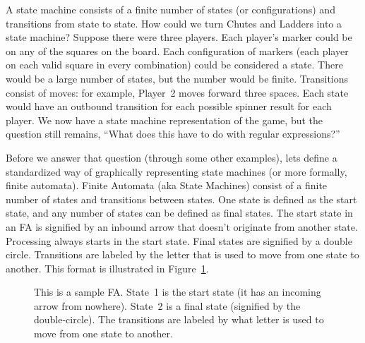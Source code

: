 \documentclass[letterpaper,12pt,openany,reqno]{book}%
\newcommand{\faterminalnode}[3] {\draw (#1) circle [radius=9pt]; \node at (#1) (#2) [circle, draw, minimum size=24pt] {#2};}
\newcommand{\fastart}[1] {\coordinate (start) at (#1);}
\newcommand{\fanonterminalnode}[2] {\node at (#1) (#2) [circle, draw, minimum size=24pt] {#2};}
\newcommand{\fatransition}[3] {\draw [-{Latex[length=3mm,width=2.5mm]}] (#1) -- (#2) node [midway, above] {#3};}
\newcommand{\faarctransition}[5] {\draw [-{Latex[length=3mm,width=2.5mm]}] (#1) to[out=#4, in=#5] node  [midway, above] {#3} (#2) ;}
\begin{document}
A state machine consists of a finite number of states (or configurations) and transitions from state to state. How could we turn Chutes and Ladders into a state machine? Suppose there were three players. Each player's marker could be on any of the squares on the board. Each configuration of markers (each player on each valid square in every combination) could be considered a state. There would be a large number of states, but the number would be finite. Transitions consist of moves: for example, Player~2 moves forward three spaces. Each state would have an outbound transition for each possible spinner result for each player. We now have a state machine representation of the game, but the question still remains, ``What does this have to do with regular expressions?''

Before we answer that question (through some other examples), lets define a standardized way of graphically representing state machines (or more formally, finite automata). Finite Automata (aka State Machines) consist of a finite number of states and transitions between states. One state is defined as the start state, and any number of states can be defined as final states. The start state in an FA is signified by an inbound arrow that doesn't originate from another state. Processing always starts in the start state. Final states are signified by a double circle. Transitions are labeled by the letter that is used to move from one state to another. This format is illustrated in Figure~\ref{F.FA_1}.

\begin{figure}[hbt]
\centering
{}
 \caption[Sample Finite Automaton]{This is a sample FA. State~1 is the start state (it has an incoming arrow from nowhere). State~2 is a final state (signified by the double-circle). The transitions are labeled by what letter is used to move from one state to another.}
  \label{F.FA_1}
\end{figure}
\end{document}
